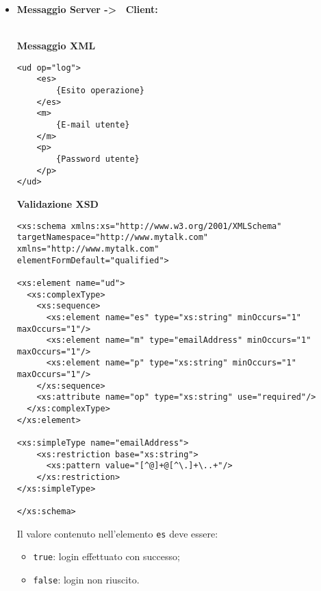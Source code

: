 {{\begin{itemize}
{\begin{lstlisting}
<xs:element name="ud">
  <xs:complexType>
    <xs:sequence>
      <xs:element name="m" type="emailAddress" minOccurs="1" maxOccurs="1"/>
      <xs:element name="p" type="xs:string" minOccurs="1" maxOccurs="1"/>
      <xs:element name="ip" type="xs:string" minOccurs="1" maxOccurs="1"/>
    </xs:sequence>
    <xs:attribute name="op" type="xs:string" use="required"/>
  </xs:complexType>
</xs:element>

<xs:simpleType name="emailAddress"> 
    <xs:restriction base="xs:string"> 
      <xs:pattern value="[^@]+@[^\.]+\..+"/> 
    </xs:restriction> 
</xs:simpleType> 

</xs:schema>	
				\end{lstlisting}
				}
				\item[] \textbf{Messaggio Server -\textgreater~ Client:}{\\
				\textbf{Messaggio XML}\\
				\begin{lstlisting}
<ud op="log">
	<es>
		{Esito operazione}
	</es>
	<m>
		{E-mail utente}
	</m>
	<p>
		{Password utente}
	</p>
</ud>
				\end{lstlisting}
				\textbf{Validazione XSD}\\
				\begin{lstlisting}
<xs:schema xmlns:xs="http://www.w3.org/2001/XMLSchema"
targetNamespace="http://www.mytalk.com"
xmlns="http://www.mytalk.com"
elementFormDefault="qualified">

<xs:element name="ud">
  <xs:complexType>
    <xs:sequence>
      <xs:element name="es" type="xs:string" minOccurs="1" maxOccurs="1"/>
      <xs:element name="m" type="emailAddress" minOccurs="1" maxOccurs="1"/>
      <xs:element name="p" type="xs:string" minOccurs="1" maxOccurs="1"/>
    </xs:sequence>
    <xs:attribute name="op" type="xs:string" use="required"/>
  </xs:complexType>
</xs:element>

<xs:simpleType name="emailAddress"> 
    <xs:restriction base="xs:string"> 
      <xs:pattern value="[^@]+@[^\.]+\..+"/> 
    </xs:restriction> 
</xs:simpleType> 

</xs:schema>	
				\end{lstlisting}
				Il valore contenuto nell'elemento \texttt{es} deve essere:
				\begin{itemize}
					\item \texttt{true}: login effettuato con successo;
					\item \texttt{false}: login non riuscito.
				\end{itemize}
			}
		\end{itemize}
	}%
	
}
